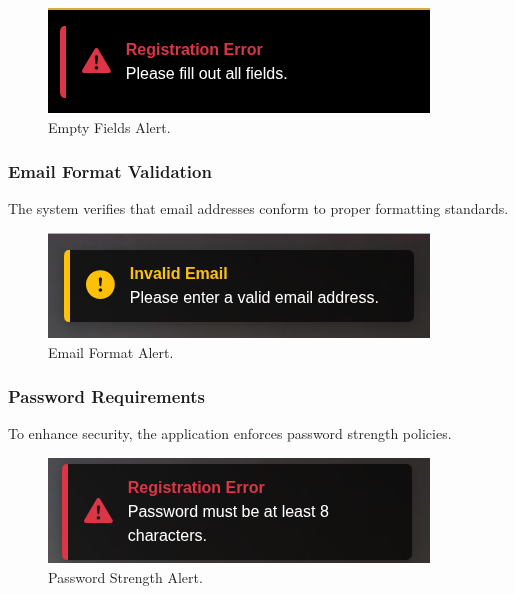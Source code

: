 \begin{figure}[H]
    \centering
    \includegraphics[width=0.65\linewidth]{Figures/images/new_images/ErrorFillOutAllTheFields.png}
    \caption{Empty Fields Alert.} %
    \label{fig:error-empty-fields-journey}
\end{figure}

\subsubsection{Email Format Validation} The system verifies that email addresses conform to proper formatting standards.

\begin{figure}[H]
    \centering
    \includegraphics[width=0.65\linewidth]{Figures/images/new_images/ErrorEmail.png}
    \caption{Email Format Alert.} %
    \label{fig:error-email-journey}
\end{figure}

\subsubsection{Password Requirements} To enhance security, the application enforces password strength policies.

\begin{figure}[H]
    \centering
    \includegraphics[width=0.65\linewidth]{Figures/images/new_images/ErrorPassword.png}
    \caption{Password Strength Alert.} %
    \label{fig:error-password-journey}
\end{figure}

